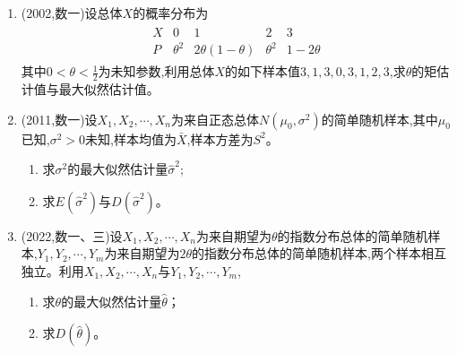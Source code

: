 \documentclass[12pt, a4paper, oneside, UTF8]{ctexbook}
\begin{document}
\begin{enumerate}[label=\arabic*.]
    \item (2002,数一)设总体$X$的概率分布为
    \begin{align*}
        \begin{array}{c|cccc}
        X & 0 & 1 & 2 &3\\
        \hline
        P & \theta^2 & 2\theta(1-\theta) &\theta^2& 1-2\theta
        \end{array}
    \end{align*}
    其中$0<\theta<\frac{1}{2}$为未知参数,利用总体$X$的如下样本值$3,1,3,0,3,1,2,3$,求$\theta$的矩估计值与最大似然估计值。
    
    \begin{solution}
    \newpage
    \end{solution}
    
    \item (2011,数一)设$X_1,X_2,\cdots,X_n$为来自正态总体$N(\mu_0,\sigma^2)$的简单随机样本,其中$\mu_0$已知,$\sigma^2>0$未知,样本均值为$\bar{X}$,样本方差为$S^2$。
    \begin{enumerate}
        \item 求$\sigma^2$的最大似然估计量$\hat{\sigma}^2$;
        \item 求$E(\hat{\sigma}^2)$与$D(\hat{\sigma}^2)$。
    \end{enumerate}
    
    \begin{solution}
    \newpage
    \end{solution}
    
    \item (2022,数一、三)设$X_1,X_2,\cdots,X_n$为来自期望为$\theta$的指数分布总体的简单随机样本,$Y_1,Y_2,\cdots,Y_m$为来自期望为$2\theta$的指数分布总体的简单随机样本,两个样本相互独立。利用$X_1,X_2,\cdots,X_n$与$Y_1,Y_2,\cdots,Y_m$,
    \begin{enumerate}
        \item 求$\theta$的最大似然估计量$\hat{\theta}$；
        \item 求$D(\hat{\theta})$。
    \end{enumerate}
    
    \begin{solution}
    \newpage
    \end{solution}
\end{enumerate}
\end{document}
